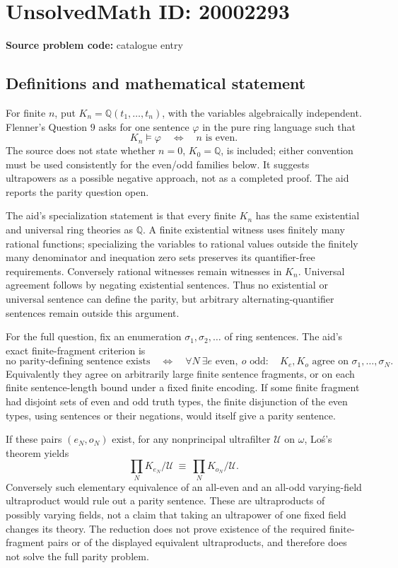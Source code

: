\documentclass[11pt]{article}
\newcommand{\Q}{\mathbb{Q}}
\begin{document}
\section*{UnsolvedMath ID: 20002293}
\textbf{Source problem code:} catalogue entry
\subsection{Definitions and mathematical statement}
For finite \(n\), put \(K_n=\Q(t_1,\ldots,t_n)\), with the variables algebraically independent. Flenner's Question \(9\) asks for one sentence \(\varphi\) in the pure ring language such that
\[
 K_n\models\varphi\quad\Longleftrightarrow\quad n\text{ is even}.
\]
The source does not state whether \(n=0\), \(K_0=\Q\), is included; either convention must be used consistently for the even/odd families below. It suggests ultrapowers as a possible negative approach, not as a completed proof. The aid reports the parity question open.

The aid's specialization statement is that every finite \(K_n\) has the same existential and universal ring theories as \(\Q\). A finite existential witness uses finitely many rational functions; specializing the variables to rational values outside the finitely many denominator and inequation zero sets preserves its quantifier-free requirements. Conversely rational witnesses remain witnesses in \(K_n\). Universal agreement follows by negating existential sentences. Thus no existential or universal sentence can define the parity, but arbitrary alternating-quantifier sentences remain outside this argument.

For the full question, fix an enumeration \(\sigma_1,\sigma_2,\ldots\) of ring sentences. The aid's exact finite-fragment criterion is
\[
 \text{no parity-defining sentence exists}
 \quad\Longleftrightarrow\quad
 \forall N\ \exists e\text{ even},\ o\text{ odd}:\quad
 K_e,K_o\text{ agree on }\sigma_1,\ldots,\sigma_N.
\]
Equivalently they agree on arbitrarily large finite sentence fragments, or on each finite sentence-length bound under a fixed finite encoding. If some finite fragment had disjoint sets of even and odd truth types, the finite disjunction of the even types, using sentences or their negations, would itself give a parity sentence.

If these pairs \((e_N,o_N)\) exist, for any nonprincipal ultrafilter \(\mathcal U\) on \(\omega\), Lo\'s's theorem yields
\[
 \prod_N K_{e_N}/\mathcal U\ \equiv\
 \prod_N K_{o_N}/\mathcal U.
\]
Conversely such elementary equivalence of an all-even and an all-odd varying-field ultraproduct would rule out a parity sentence. These are ultraproducts of possibly varying fields, not a claim that taking an ultrapower of one fixed field changes its theory. The reduction does not prove existence of the required finite-fragment pairs or of the displayed equivalent ultraproducts, and therefore does not solve the full parity problem.
\end{document}
